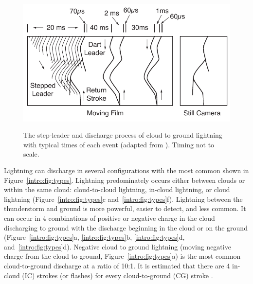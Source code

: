 \begin{figure}[ht!]
	\centering
	\includegraphics[scale=1]{Introduction/Figures/Lightning_Evolution.pdf}\\
	\caption{The step-leader and discharge process of cloud to ground lightning with typical times of each event (adapted from \citet{Uman1969}). Timing not to scale.}
	\label{intro:fig:evolution}
\end{figure}

Lightning can discharge in several configurations with the most common shown in Figure~\ref{intro:fig:types}.
Lightning predominately occurs either between clouds or within the same cloud: cloud-to-cloud lightning, in-cloud lightning, or cloud lightning (Figure~\ref{intro:fig:types}c and~\ref{intro:fig:types}f).
Lightning between the thunderstorm and ground is more powerful, easier to detect, and less common.
It can occur in 4 combinations of positive or negative charge in the cloud discharging to ground with the discharge beginning in the cloud or on the ground (Figure~\ref{intro:fig:types}a, \ref{intro:fig:types}b, \ref{intro:fig:types}d, and~\ref{intro:fig:types}d).
Negative cloud to ground lightning (moving negative charge from the cloud to ground, Figure~\ref{intro:fig:types}a) is the most common cloud-to-ground discharge at a ratio of 10:1.
It is estimated that there are 4 in-cloud (IC) strokes (or flashes) for every cloud-to-ground (CG) stroke \citep{Uman1969}.

